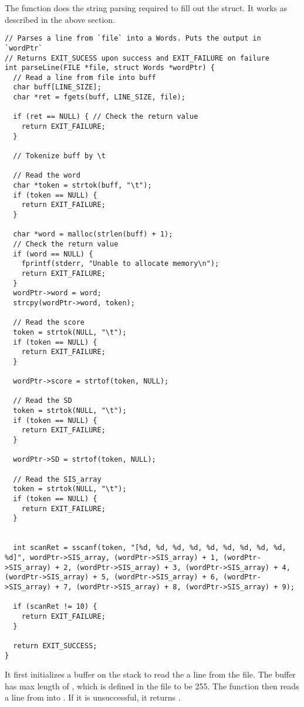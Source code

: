 \documentclass{article}
\theoremstyle{mytheoremstyle}
\theoremstyle{mytheoremstyle}
\theoremstyle{myproblemstyle}
\begin{document}
    The  function does the string parsing required to fill out the  struct. It works as described in the above section.

    \begin{lstlisting}
// Parses a line from `file` into a Words. Puts the output in `wordPtr`
// Returns EXIT_SUCESS upon success and EXIT_FAILURE on failure
int parseLine(FILE *file, struct Words *wordPtr) {
  // Read a line from file into buff
  char buff[LINE_SIZE];
  char *ret = fgets(buff, LINE_SIZE, file);

  if (ret == NULL) { // Check the return value
    return EXIT_FAILURE;
  }

  // Tokenize buff by \t

  // Read the word
  char *token = strtok(buff, "\t");
  if (token == NULL) {
    return EXIT_FAILURE;
  }

  char *word = malloc(strlen(buff) + 1);
  // Check the return value
  if (word == NULL) {
    fprintf(stderr, "Unable to allocate memory\n");
    return EXIT_FAILURE;
  }
  wordPtr->word = word;
  strcpy(wordPtr->word, token);

  // Read the score
  token = strtok(NULL, "\t");
  if (token == NULL) {
    return EXIT_FAILURE;
  }

  wordPtr->score = strtof(token, NULL);

  // Read the SD
  token = strtok(NULL, "\t");
  if (token == NULL) {
    return EXIT_FAILURE;
  }

  wordPtr->SD = strtof(token, NULL);

  // Read the SIS_array
  token = strtok(NULL, "\t");
  if (token == NULL) {
    return EXIT_FAILURE;
  }


  int scanRet = sscanf(token, "[%d, %d, %d, %d, %d, %d, %d, %d, %d, %d]", wordPtr->SIS_array, (wordPtr->SIS_array) + 1, (wordPtr->SIS_array) + 2, (wordPtr->SIS_array) + 3, (wordPtr->SIS_array) + 4, (wordPtr->SIS_array) + 5, (wordPtr->SIS_array) + 6, (wordPtr->SIS_array) + 7, (wordPtr->SIS_array) + 8, (wordPtr->SIS_array) + 9);

  if (scanRet != 10) {
    return EXIT_FAILURE;
  }

  return EXIT_SUCCESS;
}
    \end{lstlisting}

    It first initializes a buffer on the stack to read the a line from the file. The buffer has max length of , which is defined in the  file to be 255. The function then reads a line from  into . If it is unsuccessful, it returns .
\end{document}
